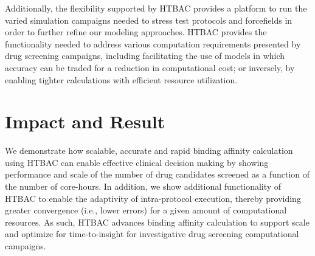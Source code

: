 \documentclass[conference]{IEEEtran}
\begin{document}
Additionally, the flexibility supported by HTBAC provides a platform to run the 
varied simulation campaigns needed to stress test protocols and forcefields in 
order to further refine our modeling approaches. HTBAC provides the 
functionality needed to address various computation requirements presented by 
drug screening campaigns, including facilitating the use of models in which  
accuracy can be traded for a reduction in computational cost; or inversely, by  
enabling tighter calculations with efficient resource utilization. 

\section{Impact and Result}\label{sec:demo}









We demonstrate how scalable, accurate and rapid binding affinity calculation 
using HTBAC can enable effective clinical decision making by showing performance 
and scale of the number of drug candidates screened as a function of the 
number of core-hours. In addition, we show additional functionality of HTBAC 
to enable the adaptivity of intra-protocol execution, thereby providing greater 
convergence (i.e., lower errors) for a given amount of computational resources. 
As such, HTBAC advances binding affinity calculation to support scale and 
optimize for time-to-insight for investigative drug screening computational 
campaigns. 




\end{document}
